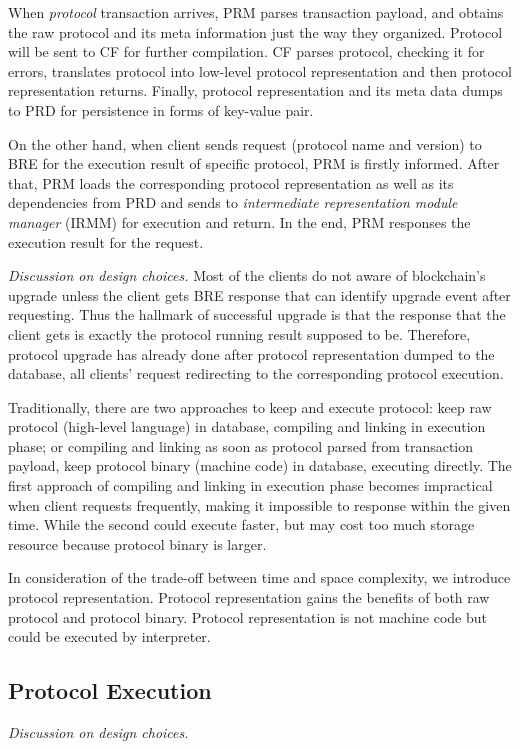 \documentclass[sigplan,screen]{acmart}
\begin{document}
When \textit{protocol} transaction arrives, PRM parses transaction payload, and
obtains the raw protocol and its meta information just the way they organized.
Protocol will be sent to CF for further compilation. CF parses protocol,
checking it for errors, translates protocol
into low-level protocol representation and then protocol representation returns.
Finally, protocol representation and its meta data dumps to PRD for persistence
in forms of key-value pair.

On the other hand, when client sends request (protocol name and version)
to BRE for the execution result of specific protocol, PRM is firstly informed.
After that, PRM loads the corresponding protocol representation as well as its
dependencies from PRD and sends to \textit{intermediate representation module
  manager }(IRMM) for execution and return.
In the end, PRM responses the execution result for the request.

\textit{Discussion on design choices.}
Most of the clients do not aware of blockchain's upgrade unless the client
gets BRE response that can identify upgrade event after requesting. Thus the
hallmark of successful upgrade is that the response that the client gets is
exactly the protocol running result supposed to be.
Therefore, protocol upgrade has already done after protocol representation
dumped to the database, all clients' request redirecting to the corresponding
protocol execution.

Traditionally, there are two approaches to keep and execute protocol: keep raw
protocol (high-level language) in database, compiling and linking in execution
phase; or compiling and linking as soon as protocol parsed from transaction
payload, keep protocol binary (machine code) in database, executing directly.
The first approach of compiling and linking in execution phase becomes
impractical when client requests frequently, making it impossible to response
within the given time. While the second could execute faster, but may cost too
much storage resource because protocol binary is larger.

In consideration of the trade-off between time and space complexity, we
introduce protocol representation. Protocol representation gains the benefits
of both raw protocol and protocol binary. Protocol representation is not
machine code but could be executed by interpreter.

\subsection{Protocol Execution}
\textit{Discussion on design choices.}
\end{document}

